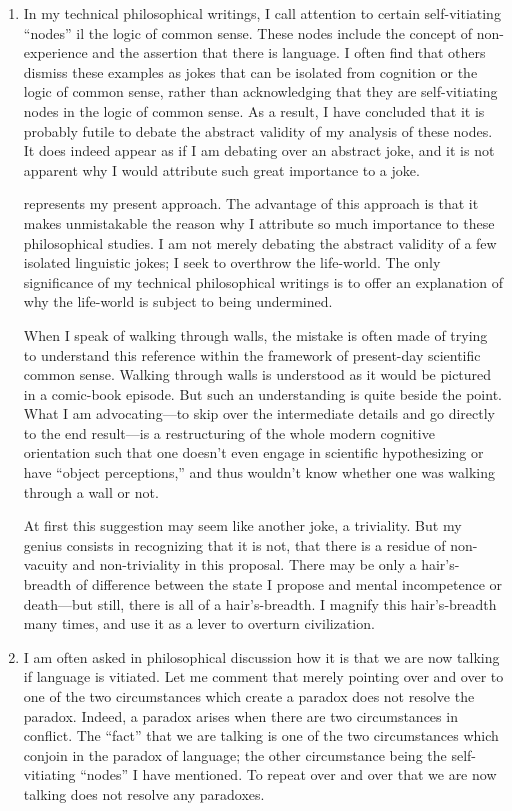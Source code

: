 \begin{enumerate}[label=\textbf{\Alph*.}, wide, nosep, itemsep=1em]
\item In my technical philosophical writings, I call attention to certain self-vitiating \enquote{nodes} il the logic of common sense. These nodes include the concept of non-experience and the assertion that there is language. I often find that others dismiss these examples as jokes that can be isolated from cognition or the logic of common sense, rather than acknowledging that they are self-vitiating nodes in the logic of common sense. As a result, I have concluded that it is probably futile to debate the abstract validity of my analysis of these nodes. It does indeed appear as if I am debating over an abstract joke, and it is not apparent why I would attribute such great importance to a joke. 

 represents my present approach. The advantage of this approach is that it makes unmistakable the reason why I attribute so much importance to these philosophical studies. I am not merely debating the abstract validity of a few isolated linguistic jokes; I seek to overthrow the life-world. The only significance of my technical philosophical writings is to offer an explanation of why the life-world is subject to being undermined. 

When I speak of walking through walls, the mistake is often made of trying to understand this reference within the framework of present-day scientific common sense. Walking through walls is understood as it would be pictured in a comic-book episode. But such an understanding is quite beside the point. What I am advocating---to skip over the intermediate details and go directly to the end result---is a restructuring of the whole modern cognitive orientation such that one doesn't even engage in scientific hypothesizing or have \enquote{object perceptions,} and thus wouldn't know whether one was walking through a wall or not. 

At first this suggestion may seem like another joke, a triviality. But my genius consists in recognizing that it is not, that there is a residue of non-vacuity and non-triviality in this proposal. There may be only a hair's-breadth of difference between the state I propose and mental incompetence or death---but still, there is all of a hair's-breadth. I magnify this hair's-breadth many times, and use it as a lever to overturn civilization. 

\item I am often asked in philosophical discussion how it is that we are now talking if language is vitiated. Let me comment that merely pointing over and over to one of the two circumstances which create a paradox does not resolve the paradox. Indeed, a paradox arises when there are two circumstances in conflict. The \enquote{fact} that we are talking is one of the two circumstances which conjoin in the paradox of language; the other circumstance being the self-vitiating \enquote{nodes} I have mentioned. To repeat over and over that we are now talking does not resolve any paradoxes. 


\end{enumerate}
